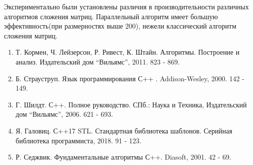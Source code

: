 Экспериментально были установлены различия в производительности различных алгоритмов сложения матриц. Параллельный алгоритм  имеет большую эффективность(при размерностях выше 200), нежели классический алгоритм сложения матриц. 

	\begin{enumerate}

		\item Т. Кормен, Ч. Лейзерсон, Р. Ривест, К. Штайн. Алгоритмы. Построение и анализ. Издательский дом ``Вильямс'', 2011. 823 - 869.
		\item Б. Страуструп. Язык программирования С++ . Addison-Wesley, 2000. 142 - 149.
		\item Г. Шилдт. С++. Полное руководство. СПб.: Наука и Техника, Издательский дом “Вильямс”, 2006. 621 - 693.
		\item Я. Галовиц. С++17 STL. Стандартная библиотека шаблонов. Серийная библиотека программиста, 2018. 91 - 123.
		\item Р. Седжвик. Фундаментальные алгоритмы С++. Diasoft, 2001. 42 - 69.

	\end{enumerate}


